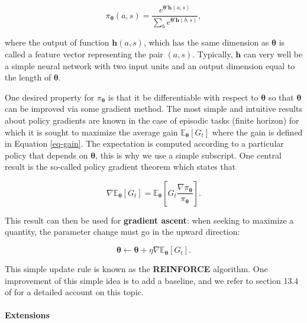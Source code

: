 \begin{equation}
\label{eq-policyex}
\pi_{\boldsymbol{\theta}}(a,s) = \frac{e^{\boldsymbol{\theta}'\textbf{h}(a,s)}}{\sum_{b}e^{\boldsymbol{\theta}'\textbf{h}(b,s)}},
\end{equation}

where the output of function $\textbf{h}(a,s)$, which has the same dimension as $\boldsymbol{\theta}$ is called a feature vector representing the pair $(a,s)$. Typically, $\textbf{h}$ can very well be a simple neural network with two input units and an output dimension equal to the length of $\boldsymbol{\theta}$.

One desired property for $\pi_{\boldsymbol{\theta}}$ is that it be differentiable with respect to $\boldsymbol{\theta}$ so that $\boldsymbol{\theta}$ can be improved via some gradient method. The most simple and intuitive results about policy gradients are known in the case of episodic tasks (finite horizon) for which it is sought to maximize the average gain $\mathbb{E}_{\boldsymbol{\theta}}[G_t]$ where the gain is defined in Equation \ref{eq-gain}. The expectation is computed according to a particular policy that depends on $\boldsymbol{\theta}$, this is why we use a simple subscript. One central result is the so-called policy gradient theorem which states that

\begin{equation}
\label{eq-PGT}
\nabla \mathbb{E}_{\boldsymbol{\theta}}[G_t]=\mathbb{E}_{\boldsymbol{\theta}} \left[G_t\frac{\nabla \pi_{\boldsymbol{\theta}}}{\pi_{\boldsymbol{\theta}}} \right].
\end{equation}

This result can then be used for \textbf{gradient ascent}: when seeking to maximize a quantity, the parameter change must go in the upward direction:

\begin{equation}
\label{eq-ascent}
\boldsymbol{\theta} \leftarrow \boldsymbol{\theta} + \eta \nabla \mathbb{E}_{\boldsymbol{\theta}}[G_t].
\end{equation}

This simple update rule is known as the \textbf{REINFORCE} algorithm. One improvement of this simple idea is to add a baseline, and we refer to section 13.4 of \cite{sutton2018reinforcement} for a detailed account on this topic.

\paragraph{Extensions}

